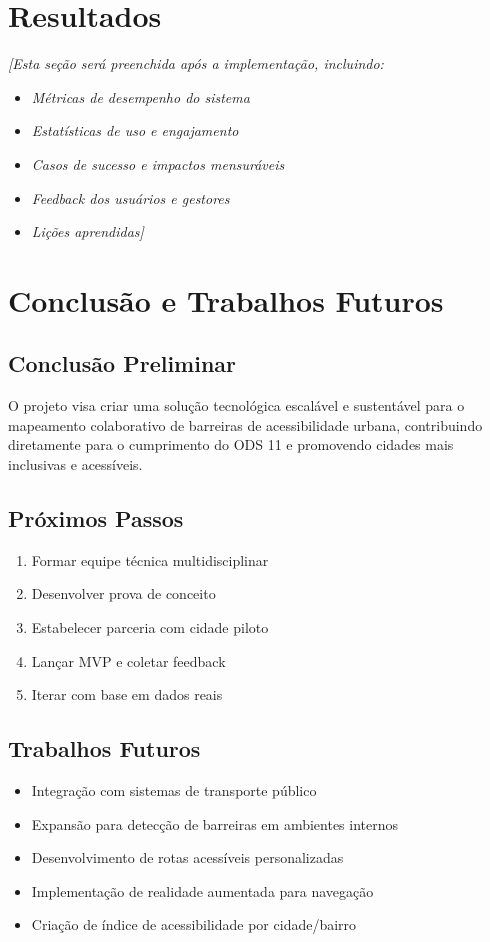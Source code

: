 \documentclass[12pt,a4paper]{article}
\begin{document}
\section{Resultados}
\label{sec:resultados}

\textit{[Esta seção será preenchida após a implementação, incluindo:}
\begin{itemize}
    \item \textit{Métricas de desempenho do sistema}
    \item \textit{Estatísticas de uso e engajamento}
    \item \textit{Casos de sucesso e impactos mensuráveis}
    \item \textit{Feedback dos usuários e gestores}
    \item \textit{Lições aprendidas]}
\end{itemize}

\section{Conclusão e Trabalhos Futuros}
\label{sec:conclusao}

\subsection{Conclusão Preliminar}

O projeto visa criar uma solução tecnológica escalável e sustentável para o mapeamento colaborativo de barreiras de acessibilidade urbana, contribuindo diretamente para o cumprimento do ODS 11 e promovendo cidades mais inclusivas e acessíveis.

\subsection{Próximos Passos}

\begin{enumerate}
    \item Formar equipe técnica multidisciplinar
    \item Desenvolver prova de conceito
    \item Estabelecer parceria com cidade piloto
    \item Lançar MVP e coletar feedback
    \item Iterar com base em dados reais
\end{enumerate}

\subsection{Trabalhos Futuros}

\begin{itemize}
    \item Integração com sistemas de transporte público
    \item Expansão para detecção de barreiras em ambientes internos
    \item Desenvolvimento de rotas acessíveis personalizadas
    \item Implementação de realidade aumentada para navegação
    \item Criação de índice de acessibilidade por cidade/bairro
\end{itemize}
\end{document}
